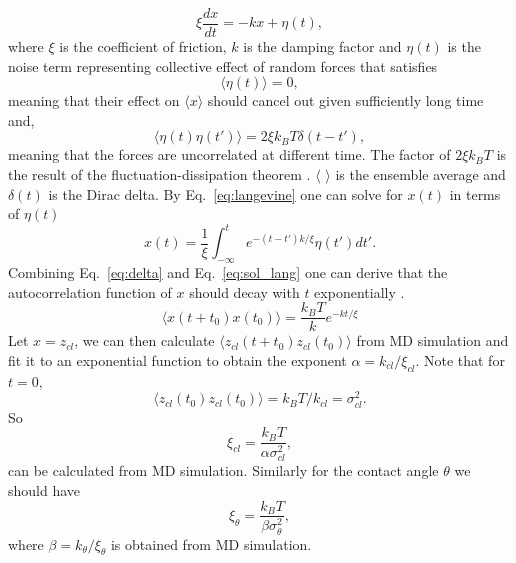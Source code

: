 \documentclass[
reprint,
 amsmath,amssymb,
 aps,
url
]{revtex4-1}
\begin{document}
\begin{equation}
	\label{eq:langevine}
	\xi\frac{d x}{dt} = -kx + \eta(t),
\end{equation}
where $\xi$ is the coefficient of friction, $k$ is the damping factor and $\eta(t)$ is the noise term representing collective effect of random forces that satisfies
\begin{equation}
	\label{eq:delta}
	\langle \eta(t) \rangle = 0,
\end{equation}
meaning that their effect on $\langle x\rangle$ should cancel out given sufficiently long time and,
\begin{equation}
	\label{fluc}
	\langle \eta(t)\eta(t') \rangle = 2\xi k_B T\delta(t-t'),
\end{equation}
meaning  that the forces are uncorrelated at different time. The factor of $2\xi k_B T$ is the result of the fluctuation-dissipation theorem \cite{feldman_theory_1989}. $\langle$ $\rangle$ is the ensemble average and $\delta(t)$ is the Dirac delta. By Eq.~\ref{eq:langevine} one can solve for $x(t)$ in terms of $\eta(t)$
\begin{equation}
	\label{eq:sol_lang}
	x(t) = \frac{1}{\xi}\int^t_{-\infty} e^{-(t-t')k/\xi}\eta(t')dt'.
\end{equation}
Combining Eq.~\ref{eq:delta} and Eq.~\ref{eq:sol_lang} one can derive that the autocorrelation function of $x$ should decay with $t$ exponentially \cite{feldman_theory_1989}.
\begin{equation}
	\label{eq:decay}
	\langle x(t+t_0)x(t_0) \rangle = \frac{k_B T}{k}e^{-kt/\xi}
\end{equation}
Let $x = z_{cl}$, we can then calculate $\langle z_{cl}(t+t_0)z_{cl}(t_0) \rangle$ from MD simulation and fit it to an exponential function to obtain the exponent $\alpha = k_{cl}/\xi_{cl}$. Note that for $t=0$,
\begin{equation}
	\langle z_{cl}(t_0)z_{cl}(t_0) \rangle = k_BT/k_{cl} = \sigma_{cl}^2.
\end{equation}
So
\begin{equation}
	\label{eq:xiTl}
	\xi_{cl} = \frac{k_BT}{\alpha\sigma_{cl}^2},
\end{equation}
can be calculated from MD simulation.
Similarly for the contact angle $\theta$ we should have
\begin{equation}
	\label{eq:xiTheta}
	\xi_{\theta} = \frac{k_BT}{\beta\sigma_{\theta}^2},
\end{equation}
where $\beta=k_\theta/\xi_\theta$ is obtained from MD simulation.
\end{document}
